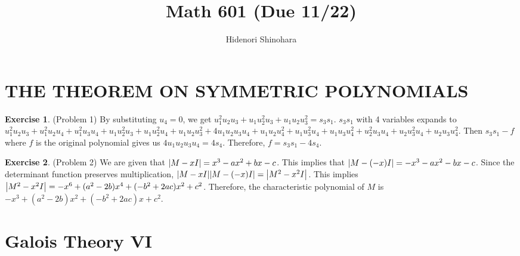 \documentclass[12pt, psamsfonts]{amsart}
\theoremstyle{definition}
\newtheorem*{exer}{Exercise}
\theoremstyle{remark}
\numberwithin{equation}{section}
\begin{document}
\title{Math 601 (Due 11/22)}
\author{Hidenori Shinohara}
\maketitle

\tableofcontents
\section{THE THEOREM ON SYMMETRIC POLYNOMIALS}

\begin{exer}{(Problem 1)}
  By substituting $u_4 = 0$, we get $u_1^2u_2u_3 + u_1u_2^2u_3 + u_1u_2u_3^2 = s_3s_1$.
  $s_3s_1$ with 4 variables expands to $u_{1}^{2} u_{2} u_{3} + u_{1}^{2} u_{2} u_{4} + u_{1}^{2} u_{3} u_{4} + u_{1} u_{2}^{2} u_{3} + u_{1} u_{2}^{2} u_{4} + u_{1} u_{2} u_{3}^{2} + 4 u_{1} u_{2} u_{3} u_{4} + u_{1} u_{2} u_{4}^{2} + u_{1} u_{3}^{2} u_{4} + u_{1} u_{3} u_{4}^{2} + u_{2}^{2} u_{3} u_{4} + u_{2} u_{3}^{2} u_{4} + u_{2} u_{3} u_{4}^{2}$.
  Then $s_3s_1 - f$ where $f$ is the original polynomial gives us $4u_1u_2u_3u_4 = 4s_4$.
  Therefore, $f = s_3s_1 - 4s_4$.
\end{exer}

\begin{exer}{(Problem 2)}
  We are given that $\abs{M - xI} = x^3 - ax^2 + bx - c$.
  This implies that $\abs{M - (-x)I} = -x^3 - ax^2 - bx - c$.
  Since the determinant function preserves multiplication, $\abs{M - xI}\abs{M - (-x)I} = \abs{M^2 - x^2I}$.
  This implies $\abs{M^2 - x^2I} = -x^6 + (a^2 - 2b)x^4 + (-b^2 + 2ac)x^2 + c^2$.
  Therefore, the characteristic polynomial of $M$ is $-x^3 + (a^2 - 2b)x^2 + (-b^2 + 2ac)x + c^2$.
\end{exer}

\section{Galois Theory VI}
\end{document}
